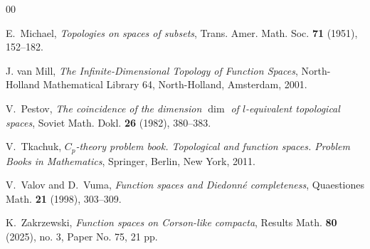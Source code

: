 \documentclass[12pt]{amsart}
\begin{document}
\begin{thebibliography}{00}


E.~Michael, \textit{Topologies on spaces of subsets}, Trans. Amer. Math. Soc. {\bf 71} (1951), 152--182.

 J. van Mill,
\textit{The Infinite-Dimensional Topology of Function Spaces}, North-Holland Mathematical Library 64, North-Holland, Amsterdam, 2001.


V.~Pestov, \textit{The coincidence of the dimension $\dim$ of $l$-equivalent topological spaces}, Soviet Math. Dokl.
 \textbf{26} (1982), 380--383. 




V.~Tkachuk, \textit{$C_p$-theory problem book. Topological and function spaces. Problem Books in Mathematics}, Springer, Berlin, New York, 2011.


V.~Valov and D.~Vuma, \textit{Function spaces and Diedonné completeness}, Quaestiones Math. \textbf{21} (1998), 303--309.

K.~Zakrzewski, \textit{Function spaces on Corson-like compacta}, Results Math. \textbf{80} (2025), no. 3, Paper No. 75, 21 pp.

\end{thebibliography}
\end{document}
